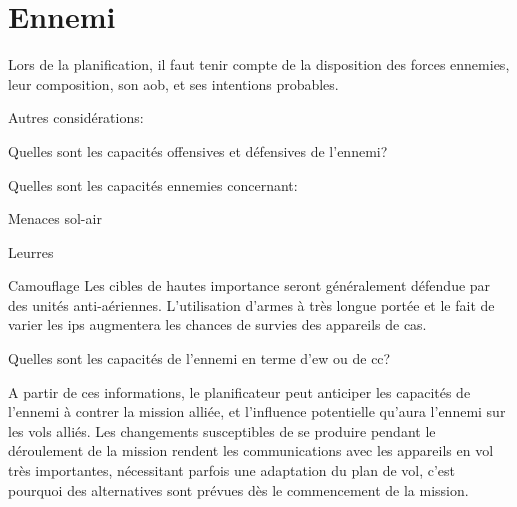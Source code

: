 \newpage
\section{Ennemi}

Lors de la planification, il faut tenir compte de la disposition des forces ennemies, leur composition, son \gls{aob}, et ses intentions probables.

\e
	\item Autres considérations:
	\ee
		\item Quelles sont les capacités offensives et défensives de l'ennemi?
		\item Quelles sont les capacités ennemies concernant:
		\eee
			\item Menaces sol-air
			\item Leurres
			\item Camouflage
		\ed
		Les cibles de hautes importance seront généralement défendue par des unités anti-aériennes. L'utilisation d'armes à très longue portée et le fait de varier les \glspl{ip} augmentera les chances de survies des appareils de \gls{cas}.
		\item Quelles sont les capacités de l'ennemi en terme d'\gls{ew} ou de \gls{cc}?
	\ed
	\item A partir de ces informations, le planificateur peut anticiper les capacités de l'ennemi à contrer la mission alliée, et l'influence potentielle qu'aura l'ennemi sur les vols alliés. Les changements susceptibles de se produire pendant le déroulement de la mission rendent les communications avec les appareils en vol très importantes, nécessitant parfois une adaptation du plan de vol, c'est pourquoi des alternatives sont prévues dès le commencement de la mission.
\ed